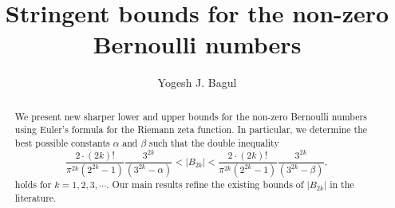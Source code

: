 \documentclass[eqnumis, pdf]{yjb}
\begin{document}

% 


\title{Stringent bounds for the non-zero Bernoulli numbers}

\author{Yogesh J. Bagul}

\address{Department of Mathematics\\ K. K. M. College, Manwath\\ Dist: Parbhani (M. S.) - 431505, India
	}

\maketitle
\begin{abstract}
We present new sharper lower and upper bounds for the non-zero Bernoulli numbers using Euler's formula for the Riemann zeta function. In particular, we determine the best possible constants $ \alpha $ and $ \beta $ such that the double inequality
$$ \frac{2\cdot (2k)!}{\pi^{2k} (2^{2k}-1)}\frac{3^{2k}}{(3^{2k}-\alpha)} < \vert B_{2k} \vert < \frac{2\cdot (2k)!}{\pi^{2k} (2^{2k}-1)}\frac{3^{2k}}{(3^{2k}-\beta)}, $$
holds for $ k = 1, 2, 3, \cdots.$ Our main results refine the existing bounds of $ \vert B_{2k} \vert $ in the literature.
\end{abstract}%


\vspace{10pt}
\end{document}
